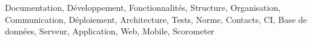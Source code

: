 Documentation, Développement, Fonctionnalités, Structure, Organisation, Communication, Déploiement, Architecture, Tests, Norme, Contacts, CI, Base de données, Serveur, Application, Web, Mobile, Scorometer